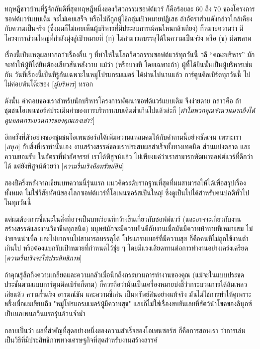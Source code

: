 ทฤษฎีชาวบ้านที่รู้จักกันดีที่สุดทฤษฎีหนึ่งของวิศวกรรมซอฟต์แวร์
ก็คือร้อยละ 60 ถึง 70 ของโครงการซอฟต์แวร์แบบเดิม จะไม่เคยเสร็จ
หรือไม่ก็ถูกผู้ใช้กลุ่มเป้าหมายปฏิเสธ
ถ้าอัตราส่วนดังกล่าวใกล้เคียงกับความเป็นจริง
(ซึ่งผมก็ไม่เคยเห็นผู้บริหารที่มีประสบการณ์คนไหนกล้าเถียง) ก็หมายความว่า
มีโครงการส่วนใหญ่ที่กำลังมุ่งสู่เป้าหมายที่ (ก)
ไม่สามารถบรรลุได้ในความเป็นจริง หรือ (ข) ผิดพลาด

เรื่องนี้เป็นเหตุผลมากกว่าเรื่องอื่น ๆ
ที่ทำให้ในโลกวิศวกรรมซอฟต์แวร์ทุกวันนี้ วลี ``คณะบริหาร''
มักจะทำให้ผู้ที่ได้ยินต้องเสียวสันหลังวาบ แม้ว่า (หรือบางที โดยเฉพาะถ้า)
ผู้ที่ได้ยินนั้นเป็นผู้บริหารเช่นกัน
วันที่เรื่องนี้เป็นที่รู้กันเฉพาะในหมู่โปรแกรมเมอร์ ได้ผ่านไปนานแล้ว
การ์ตูนดิลเบิร์ตทุกวันนี้ ไปไม่ค่อยพ้นโต๊ะของ {[}\emph{ผู้บริหาร}{]}
หรอก

ดังนั้น คำตอบของเราสำหรับนักบริหารโครงการพัฒนาซอฟต์แวร์แบบเดิม
จึงง่ายดาย กล่าวคือ
ถ้าชุมชนโอเพนซอร์สประเมินค่าของการบริหารแบบเดิมต่ำเกินไปแล้วล่ะก็
{[}\emph{ทำไมพวกคุณจำนวนมากถึงได้ดูแคลนกระบวนการของคุณเองเล่า?}{]}

อีกครั้งที่ตัวอย่างของชุมชนโอเพนซอร์สได้เพิ่มความแหลมคมให้กับคำถามนี้อย่างชัดเจน
เพราะเรา {[}\emph{สนุก}{]} กับสิ่งที่เราทำนั่นเอง
งานสร้างสรรค์ของเราประสบผลสำเร็จทั้งทางเทคนิค ส่วนแบ่งตลาด และความยอมรับ
ในอัตราที่น่าอัศจรรย์ เราได้พิสูจน์แล้ว
ไม่เพียงแค่ว่าเราสามารถพัฒนาซอฟต์แวร์ที่ดีกว่าได้ แต่ยังพิสูจน์ด้วยว่า
{[}\emph{ความรื่นเริงคือทรัพย์สิน}{]}

สองปีครึ่งหลังจากเขียนบทความนี้รุ่นแรก
แนวคิดระดับรากฐานที่สุดที่ผมสามารถให้ได้เพื่อสรุปเรื่องทั้งหมด
ไม่ใช่วิสัยทัศน์ของโลกซอฟต์แวร์ที่โอเพนซอร์สเป็นใหญ่
ซึ่งดูเป็นไปได้สำหรับคนปกติทั่วไปในทุกวันนี้

แต่ผมต้องการชี้แนะในสิ่งที่อาจเป็นบทเรียนที่กว้างขึ้นเกี่ยวกับซอฟต์แวร์
(และอาจจะเกี่ยวกับงานสร้างสรรค์และงานวิชาชีพทุกชนิด)
มนุษย์มักจะมีความยินดีกับงานเมื่อมันมีความท้าทายที่เหมาะสม
ไม่ง่ายจนน่าเบื่อ และไม่ยากจนไม่สามารถบรรลุได้ โปรแกรมเมอร์ที่มีความสุข
ก็คือคนที่ไม่ถูกใช้งานต่ำเกินไป หรือต้องแบกรับเป้าหมายที่กำหนดไว้ชุ่ย ๆ
โดยมีแรงเสียดทานต่อการทำงานอย่างเคร่งเครียด
{[}\emph{ความรื่นเริงจะให้ประสิทธิภาพ}{]}

ถ้าคุณรู้สึกถึงความเกลียดและความกลัวเมื่อนึกถึงกระบวนการทำงานของคุณ
(แม้จะในแบบประชดประชันตามแบบการ์ตูนดิลเบิร์ตก็ตาม)
ก็ควรถือว่านั่นเป็นเครื่องหมายบ่งชี้ว่ากระบวนการได้ล้มเหลวเสียแล้ว
ความรื่นเริง อารมณ์ขัน และความขี้เล่น เป็นทรัพย์สินอย่างแท้จริง
มันไม่ใช่การทำให้ดูเพราะพริ้งเมื่อผมเขียนถึง
"หมู่โปรแกรมเมอร์ผู้มีความสุข"
และก็ไม่ใช่เรื่องขบขันเลยที่สัตว์นำโชคของลินุกซ์เป็นนกเพนกวินแรกรุ่นอ้วนจ้ำม่ำ

กลายเป็นว่า ผลที่สำคัญที่สุดอย่างหนึ่งของความสำเร็จของโอเพนซอร์ส
ก็คือการสอนเรา
ว่าการเล่นเป็นวิธีที่มีประสิทธิภาพทางเศรษฐกิจที่สุดสำหรับงานสร้างสรรค์
